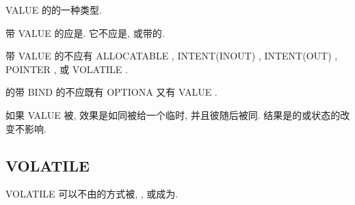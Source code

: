 VALUE \Attribute{}\Specify{}\DummyArgument{}的\Argument{}\Association{}的一种类型.

带 VALUE \Attribute{}的\Entity{}应是\DummyArgument{}\Object{}. 它不应是\AssumedSizeArray{}, \Coarray{}或带\Coarray{}\UltimateComponent{}的\Variable{}.

带 VALUE \Attribute{}的\Entity{}不应有 ALLOCATABLE , INTENT(INOUT) , INTENT(OUT) , POINTER , 或 VOLATILE \Attribute{}.

\Procedure{}的带 BIND \Attribute{}的\DummyArgument{}不应既有 OPTIONA \Attribute{}又有 VALUE \Attribute{}.

如果 VALUE \Attribute{}被\Specify{}, 效果是如同\ActualArgument{}被\Assign{}给一个临时\Variable{}, 并且彼\Variable{}随后被同\DummyArgument{}\Argument{}\Associate{}. 结果是\DummyArgument{}的\Value{}或\Definition{}状态的改变不影响\ActualArgument{}.

\subsection{ VOLATILE \Attribute{}}

VOLATILE \Attribute{}\Specify{}\Object{}可以不由\Program{}\Specify{}的方式被\Reference{}, \Define, 或成为\Undefined{}.
